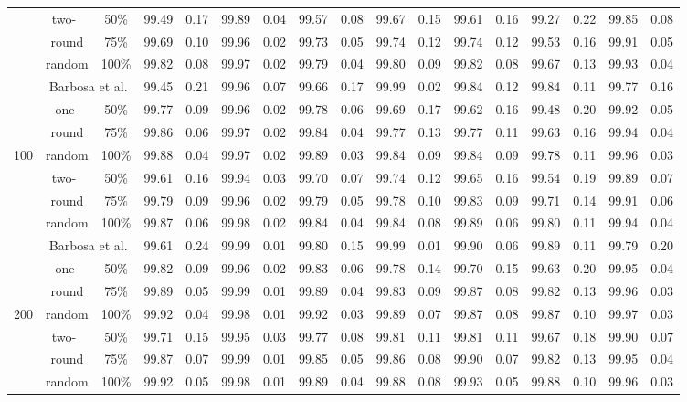 \begin{table*}[t]
\begin{tabular}{|c||c|c||c|c||c|c||c|c||c|c||c|c||c|c||c|c|}
  ~&two-~&50\%&99.49&0.17&99.89&0.04&99.57&0.08&99.67&0.15&99.61&0.16&99.27&0.22&99.85&0.08\\
  \cline{3-17}
  ~&round&75\%&99.69&0.10&99.96&0.02&99.73&0.05&99.74&0.12&99.74&0.12&99.53&0.16&99.91&0.05\\
  \cline{3-17}
  ~&random&100\%&99.82&0.08&99.97&0.02&99.79&0.04&99.80&0.09&99.82&0.08&99.67&0.13&99.93&0.04\\
  \hline
  \hline
  ~&\multicolumn{2}{|c||}{Barbosa et al.}&99.45&0.21&99.96&0.07&99.66&0.17&99.99&0.02&99.84&0.12&99.84&0.11&99.77&0.16\\
  \cline{2-17}
  ~&one-&50\%&99.77&0.09&99.96&0.02&99.78&0.06&99.69&0.17&99.62&0.16&99.48&0.20&99.92&0.05\\
  \cline{3-17}
  ~&round&75\%&99.86&0.06&99.97&0.02&99.84&0.04&99.77&0.13&99.77&0.11&99.63&0.16&99.94&0.04\\
  \cline{3-17}
  100&random&100\%&99.88&0.04&99.97&0.02&99.89&0.03&99.84&0.09&99.84&0.09&99.78&0.11&99.96&0.03\\
  \cline{2-17}
  ~&two-~&50\%&99.61&0.16&99.94&0.03&99.70&0.07&99.74&0.12&99.65&0.16&99.54&0.19&99.89&0.07\\
  \cline{3-17}
  ~&round&75\%&99.79&0.09&99.96&0.02&99.79&0.05&99.78&0.10&99.83&0.09&99.71&0.14&99.91&0.06\\
  \cline{3-17}
  ~&random&100\%&99.87&0.06&99.98&0.02&99.84&0.04&99.84&0.08&99.89&0.06&99.80&0.11&99.94&0.04\\
  \hline
  \hline
  ~&\multicolumn{2}{|c||}{Barbosa et al.}&99.61&0.24&99.99&0.01&99.80&0.15&99.99&0.01&99.90&0.06&99.89&0.11&99.79&0.20\\
  \cline{2-17}
  ~&one-&50\%&99.82&0.09&99.96&0.02&99.83&0.06&99.78&0.14&99.70&0.15&99.63&0.20&99.95&0.04\\
  \cline{3-17}
  ~&round&75\%&99.89&0.05&99.99&0.01&99.89&0.04&99.83&0.09&99.87&0.08&99.82&0.13&99.96&0.03\\
  \cline{3-17}
  200&random&100\%&99.92&0.04&99.98&0.01&99.92&0.03&99.89&0.07&99.87&0.08&99.87&0.10&99.97&0.03\\
  \cline{2-17}
  ~&two-~&50\%&99.71&0.15&99.95&0.03&99.77&0.08&99.81&0.11&99.81&0.11&99.67&0.18&99.90&0.07\\
  \cline{3-17}
  ~&round&75\%&99.87&0.07&99.99&0.01&99.85&0.05&99.86&0.08&99.90&0.07&99.82&0.13&99.95&0.04\\
  \cline{3-17}
  ~&random&100\%&99.92&0.05&99.98&0.01&99.89&0.04&99.88&0.08&99.93&0.05&99.88&0.10&99.96&0.03\\
  \hline
\end{tabular}
\vspace{-4ex}
\end{table*}


